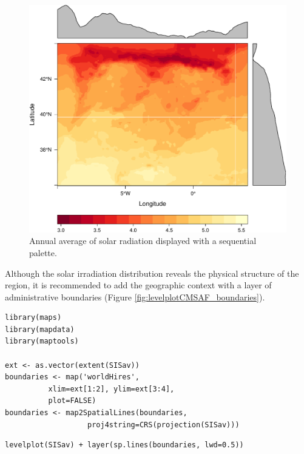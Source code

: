 \begin{figure}[htb]
\centering
\includegraphics[width=.9\linewidth]{figs/leveplotSISavOrig.pdf}
\caption{\label{fig:levelplotCMSAF}Annual average of solar radiation displayed with a sequential palette.}
\end{figure}

Although the solar irradiation distribution reveals the physical
structure of the region, it is recommended to add the geographic
context with a layer of administrative boundaries (Figure
\ref{fig:levelplotCMSAF_boundaries}).


\lstset{language=R,numbers=none}
\begin{lstlisting}
library(maps)
library(mapdata)
library(maptools)

ext <- as.vector(extent(SISav))
boundaries <- map('worldHires',
		  xlim=ext[1:2], ylim=ext[3:4],
		  plot=FALSE)
boundaries <- map2SpatialLines(boundaries,
			       proj4string=CRS(projection(SISav)))
\end{lstlisting}


\lstset{language=R,numbers=none}
\begin{lstlisting}
levelplot(SISav) + layer(sp.lines(boundaries, lwd=0.5))
\end{lstlisting}

